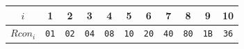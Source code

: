 \begin{tabular}{|c|c|c|c|c|c|c|c|c|c|c|}
\hline
\cellcolor{gray!30}$i$ & \cellcolor{gray!30}1 & \cellcolor{gray!30}2 & \cellcolor{gray!30}3 & \cellcolor{gray!30}4 & \cellcolor{gray!30}5 & \cellcolor{gray!30}6 & \cellcolor{gray!30}7 & \cellcolor{gray!30}8 & \cellcolor{gray!30}9 & \cellcolor{gray!30}10 \\ \hline
\cellcolor{gray!30}$Rcon_i$ & \texttt{01} & \texttt{02} & \texttt{04} & \texttt{08} & \texttt{10} & \texttt{20} & \texttt{40} & \texttt{80} & \texttt{1B} & \texttt{36} \\ \hline
\end{tabular}
